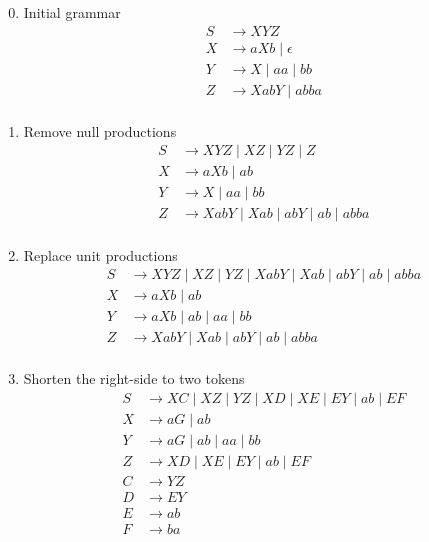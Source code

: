 \documentclass[../Document.tex]{subfiles}
\begin{document}
\begin{enumerate}
    \setcounter{enumi}{-1}
    \item Initial grammar
        \begin{align*}
            S &\rightarrow XYZ\\
            X &\rightarrow aXb \mid \epsilon\\
            Y &\rightarrow X \mid aa \mid bb\\
            Z &\rightarrow XabY \mid abba\\
        \end{align*}
    \item Remove null productions
        \begin{align*}
            S &\rightarrow XYZ \mid XZ \mid YZ \mid Z\\
            X &\rightarrow aXb \mid ab\\
            Y &\rightarrow X \mid aa \mid bb\\
            Z &\rightarrow XabY \mid Xab \mid abY \mid ab \mid abba\\
        \end{align*}
    \item Replace unit productions
        \begin{align*}
            S &\rightarrow XYZ \mid XZ \mid YZ \mid XabY \mid Xab \mid abY \mid ab \mid abba\\
            X &\rightarrow aXb \mid ab\\
            Y &\rightarrow aXb \mid ab \mid aa \mid bb\\
            Z &\rightarrow XabY \mid Xab \mid abY \mid ab \mid abba\\
        \end{align*}
    \item Shorten the right-side to two tokens
        \begin{align*}
            S &\rightarrow XC \mid XZ \mid YZ \mid XD \mid XE \mid EY \mid ab \mid EF\\
            X &\rightarrow aG \mid ab\\
            Y &\rightarrow aG \mid ab \mid aa \mid bb\\
            Z &\rightarrow XD \mid XE \mid EY \mid ab \mid EF\\
            C &\rightarrow YZ\\
            D &\rightarrow EY\\
            E &\rightarrow ab\\
            F &\rightarrow ba\\

\end{align*}
\end{enumerate}
\end{document}
